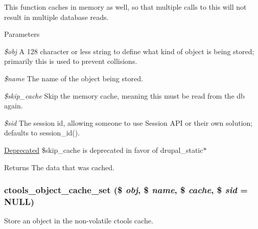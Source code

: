 This function caches in memory as well, so that multiple calls to this will not result in multiple database reads.


\begin{DoxyParams}{Parameters}
\item[{\em \$obj}]A 128 character or less string to define what kind of object is being stored; primarily this is used to prevent collisions. \item[{\em \$name}]The name of the object being stored. \item[{\em \$skip\_\-cache}]Skip the memory cache, meaning this must be read from the db again. \item[{\em \$sid}]The session id, allowing someone to use Session API or their own solution; defaults to session\_\-id().\end{DoxyParams}
\begin{Desc}
\item[\hyperlink{deprecated__deprecated000002}{Deprecated}]\$skip\_\-cache is deprecated in favor of drupal\_\-static$\ast$ \end{Desc}
\begin{DoxyReturn}{Returns}
The data that was cached. 
\end{DoxyReturn}
\hypertarget{object-cache_8inc_a996b3d25d26d4d3188cf7952d6988e65}{
\subsubsection[{ctools\_\-object\_\-cache\_\-set}]{\setlength{\rightskip}{0pt plus 5cm}ctools\_\-object\_\-cache\_\-set (\$ {\em obj}, \/  \$ {\em name}, \/  \$ {\em cache}, \/  \$ {\em sid} = {\ttfamily NULL})}}
\label{object-cache_8inc_a996b3d25d26d4d3188cf7952d6988e65}
Store an object in the non-\/volatile ctools cache.


